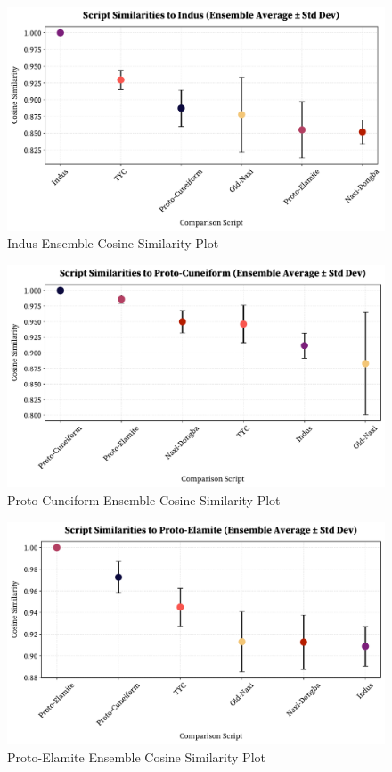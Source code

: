 \documentclass[11pt,a4paper,oneside]{report}
\begin{document}
 \begin{figure}[H]
    \centering
    \includegraphics[width=1\linewidth]{Visualizations/Cosine Similarity/indus_ensemble_similarities.pdf}
     \caption{Indus Ensemble Cosine Similarity Plot}
\end{figure}

 \begin{figure}[H]
    \centering
    \includegraphics[width=1\linewidth]{Visualizations/Cosine Similarity/proto-cuneiform_ensemble_similarities.pdf}
     \caption{Proto-Cuneiform Ensemble Cosine Similarity Plot}
\end{figure}

 \begin{figure}[H]
    \centering
    \includegraphics[width=1\linewidth]{Visualizations/Cosine Similarity/proto-elamite_ensemble_similarities.pdf}
     \caption{Proto-Elamite Ensemble Cosine Similarity Plot}
\end{figure}
\end{document}
